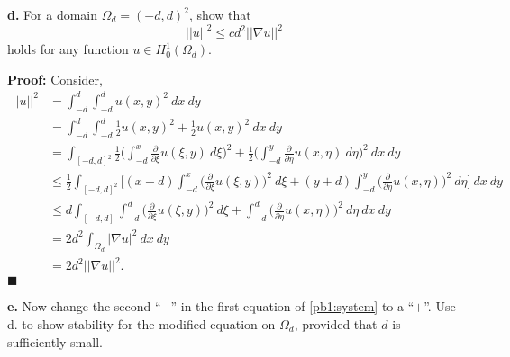 \documentclass[11pt]{article}
\begin{document}
\vskip 2cm


\textbf{d.} For a domain $\Omega_d = (-d, d)^2$, show that 
\begin{equation}
    ||u||^2 \leq c d^2 ||\nabla u||^2 
\end{equation}
holds for any function $u \in H^1_0(\Omega_d)$.

\vskip 1cm


\textbf{Proof:} Consider,
\begin{align*}
    ||u||^2 &= \int_{-d}^d \int_{-d}^d u(x,y)^2 \: dx \: dy \\
    &= \int_{-d}^d \int_{-d}^d \frac{1}{2} u(x,y)^2 + \frac{1}{2} u(x,y)^2 \: dx \: dy \\
    &= \int_{[-d,d]^2} \frac{1}{2} \Big( \int_{-d}^x \frac{\partial }{\partial \xi} u(\xi, y) \: d\xi \Big)^2 + \frac{1}{2} \Big( \int_{-d}^y \frac{\partial }{\partial \eta} u(x, \eta) \: d\eta \Big)^2 \: dx \: dy \\
    &\leq \frac{1}{2} \int_{[-d,d]^2} \Big[ (x + d) \int_{-d}^x \Big(\frac{\partial }{\partial \xi} u(\xi, y)\Big)^2 \: d\xi + (y + d) \int_{-d}^y \Big(\frac{\partial }{\partial \eta} u(x, \eta)\Big)^2 \: d\eta \Big]\: dx \: dy \\
    &\leq d \int_{[-d,d]} \int_{-d}^d \Big(\frac{\partial }{\partial \xi} u(\xi, y)\Big)^2 \: d\xi + \int_{-d}^d \Big(\frac{\partial }{\partial \eta} u(x, \eta)\Big)^2 \: d\eta \: dx \: dy \\
    &= 2d^2 \int_{\Omega_d} |\nabla u |^2 \: dx \: dy \\
    &= 2d^2 ||\nabla u ||^2.
\end{align*}
$\blacksquare$


\vskip 2cm



\textbf{e.} Now change the second “$-$” in the first equation of \eqref{pb1:system} to a “$+$”. Use d. to show stability for the modified equation on $\Omega_d$, provided that $d$ is sufficiently small.

\vskip 1cm
\end{document}
